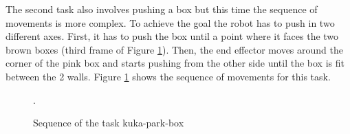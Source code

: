 The second task also involves pushing a box but this time the sequence of movements is more complex. To achieve the goal the robot has to push in two different axes. First, it has to push the box until a point where it faces the two brown boxes (third frame of Figure \ref{fig:sequence-park-box}). Then, the end effector moves around the corner of the pink box and starts pushing from the other side until the box is fit between the 2 walls. Figure \ref{fig:sequence-park-box} shows the sequence of movements for this task.


 \begin{figure}[H]
  \centering
   \hfill
   \hfill
   \hfill
   \hfill
   \hfill
  \caption{Sequence of the task kuka-park-box}.
  \label{fig:sequence-park-box}
\end{figure}



